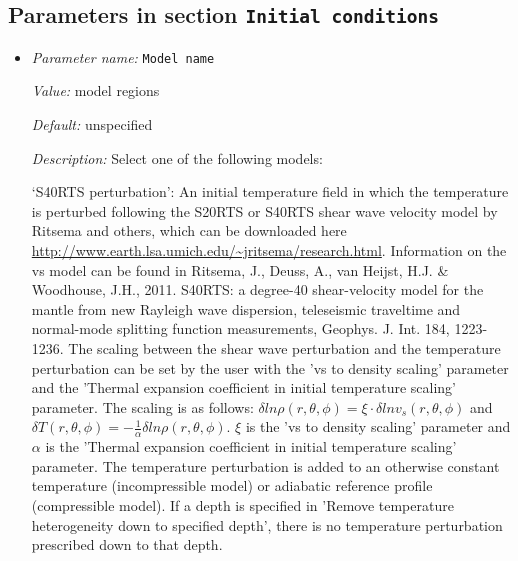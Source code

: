 \subsection{Parameters in section \tt Initial conditions}
\label{parameters:Initial_20conditions}

\begin{itemize}
\item {\it Parameter name:} {\tt Model name}
\label{parameters:Initial conditions/Model name}


{\it Value:} model regions


{\it Default:} unspecified


{\it Description:} Select one of the following models:

`S40RTS perturbation': An initial temperature field in which the temperature is perturbed following the S20RTS or S40RTS shear wave velocity model by Ritsema and others, which can be downloaded here \url{http://www.earth.lsa.umich.edu/~jritsema/research.html}. Information on the vs model can be found in Ritsema, J., Deuss, A., van Heijst, H.J. \& Woodhouse, J.H., 2011. S40RTS: a degree-40 shear-velocity model for the mantle from new Rayleigh wave dispersion, teleseismic traveltime and normal-mode splitting function measurements, Geophys. J. Int. 184, 1223-1236. The scaling between the shear wave perturbation and the temperature perturbation can be set by the user with the 'vs to density scaling' parameter and the 'Thermal expansion coefficient in initial temperature scaling' parameter. The scaling is as follows: $\delta ln \rho (r,\theta,\phi) = \xi \cdot \delta ln v_s(r,\theta, \phi)$ and $\delta T(r,\theta,\phi) = - \frac{1}{\alpha} \delta ln \rho(r,\theta,\phi)$. $\xi$ is the 'vs to density scaling' parameter and $\alpha$ is the 'Thermal expansion coefficient in initial temperature scaling' parameter. The temperature perturbation is added to an otherwise constant temperature (incompressible model) or adiabatic reference profile (compressible model). If a depth is specified in 'Remove temperature heterogeneity down to specified depth', there is no temperature perturbation prescribed down to that depth.


\end{itemize}
